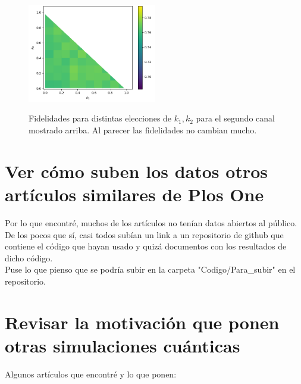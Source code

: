 \documentclass[10pt,letterpaper]{article} %
\begin{document}
\begin{figure}[h!]
\begin{center}
\includegraphics[width=0.5\textwidth]{images/2qbit.png}\\
\caption{Fidelidades para distintas elecciones de $k_1, k_2$ para el segundo canal mostrado arriba.  Al parecer las fidelidades no cambian mucho. }
\end{center}
\end{figure}

\newpage
\section{Ver cómo suben los datos otros artículos similares de Plos One}

Por lo que encontré, muchos de los artículos no tenían datos abiertos al público.
De los pocos que sí, casi todos subían un link a un repositorio de github que  contiene el código que hayan usado y quizá documentos con los resultados de dicho código.\\

Puse lo que pienso que se podría subir en la carpeta "Codigo/Para_subir" en el repositorio. 




\section{Revisar la motivación que ponen otras simulaciones cuánticas}

Algunos artículos que encontré y lo que ponen:
\end{document}
